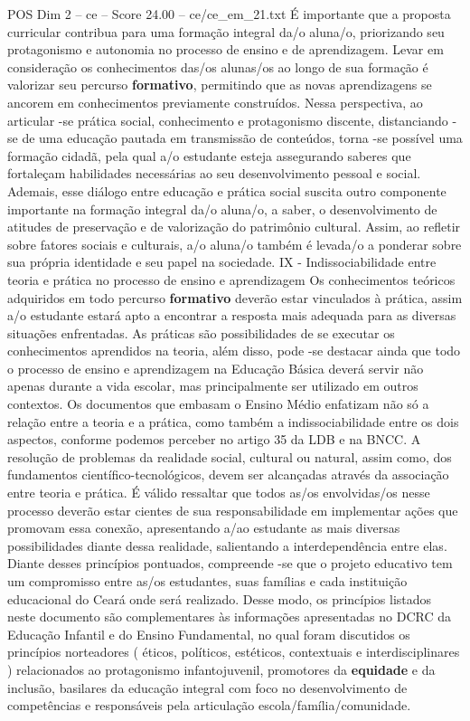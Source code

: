 \begin{textsample}{POS Dim 2 – ce – Score 24.00 – ce/ce\_em\_21.txt}
É importante que a proposta curricular contribua para uma formação integral da/o aluna/o, priorizando seu protagonismo e autonomia no processo de ensino e de aprendizagem.
Levar em consideração os conhecimentos das/os alunas/os ao longo de sua formação é valorizar seu percurso \textbf{formativo}, permitindo que as novas aprendizagens se ancorem em conhecimentos previamente construídos.
Nessa perspectiva, ao articular -se prática social, conhecimento e protagonismo discente, distanciando -se de uma educação pautada em transmissão de conteúdos, torna -se possível uma formação cidadã, pela qual a/o estudante esteja assegurando saberes que fortaleçam habilidades necessárias ao seu desenvolvimento pessoal e social.
Ademais, esse diálogo entre educação e prática social suscita outro componente importante na formação integral da/o aluna/o, a saber, o desenvolvimento de atitudes de preservação e de valorização do patrimônio cultural.
Assim, ao refletir sobre fatores sociais e culturais, a/o aluna/o também é levada/o a ponderar sobre sua própria identidade e seu papel na sociedade.
IX - Indissociabilidade entre teoria e prática no processo de ensino e aprendizagem Os conhecimentos teóricos adquiridos em todo percurso \textbf{formativo} deverão estar vinculados à prática, assim a/o estudante estará apto a encontrar a resposta mais adequada para as diversas situações enfrentadas.
As práticas são possibilidades de se executar os conhecimentos aprendidos na teoria, além disso, pode -se destacar ainda que todo o processo de ensino e aprendizagem na Educação Básica deverá servir não apenas durante a vida escolar, mas principalmente ser utilizado em outros contextos.
Os documentos que embasam o Ensino Médio enfatizam não só a relação entre a teoria e a prática, como também a indissociabilidade entre os dois aspectos, conforme podemos perceber no artigo 35 da LDB e na BNCC.
A resolução de problemas da realidade social, cultural ou natural, assim como, dos fundamentos científico-tecnológicos, devem ser alcançadas através da associação entre teoria e prática.
É válido ressaltar que todos as/os envolvidas/os nesse processo deverão estar cientes de sua responsabilidade em implementar ações que promovam essa conexão, apresentando a/ao estudante as mais diversas possibilidades diante dessa realidade, salientando a interdependência entre elas.
Diante desses princípios pontuados, compreende -se que o projeto educativo tem um compromisso entre as/os estudantes, suas famílias e cada instituição educacional do Ceará onde será realizado.
Desse modo, os princípios listados neste documento são complementares às informações apresentadas no DCRC da Educação Infantil e do Ensino Fundamental, no qual foram discutidos os princípios norteadores ( éticos, políticos, estéticos, contextuais e interdisciplinares ) relacionados ao protagonismo infantojuvenil, promotores da \textbf{equidade} e da inclusão, basilares da educação integral com foco no desenvolvimento de competências e responsáveis pela articulação escola/família/comunidade.

\end{textsample}
